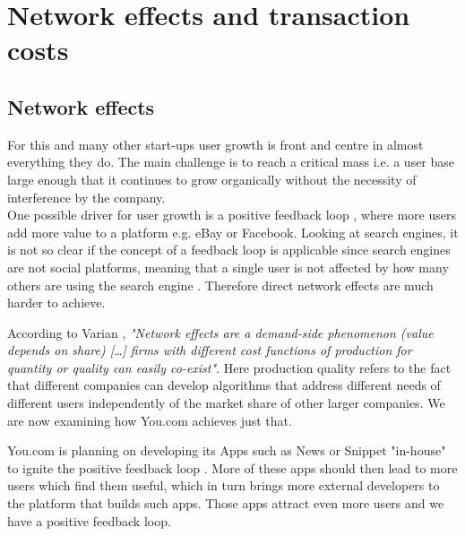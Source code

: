 \documentclass[5p,twocolumn,final]{elsarticle}
\begin{document}

\section{Network effects and transaction costs}

\subsection{Network effects}
For this and many other start-ups user growth is front and centre in almost everything they do.
The main challenge is to reach a critical mass \cite[p.15 ff.]{shapiro1999} i.e. a user base large enough that it continues to grow organically without the necessity of interference by the company.\\
One possible driver for user growth is a positive feedback loop \cite[p.175 ff.]{shapiro1999}, where more users add more value to a platform e.g. eBay or Facebook. Looking at search engines, it is not so clear if the concept of a feedback loop is applicable since search engines are not social platforms, meaning that a single user is not affected by how many others are using the search engine \cite{varian2017}. Therefore direct network effects are much harder to achieve. \par
According to Varian \cite{varian2017}, \textit{"Network effects are a demand-side phenomenon (value depends on share) […] firms with different cost functions of production for quantity or quality can easily co-exist"}. Here production quality refers to the fact that different companies can develop algorithms that address different needs of different users independently of the market share of other larger companies. We are now examining how You.com achieves just that.\par
You.com is planning on developing its Apps such as News or Snippet "in-house" to ignite the positive feedback loop \cite{techcrunch2022}. More of these apps should then lead to more users which find them useful, which in turn brings more external developers to the platform that builds such apps. Those apps attract even more users and we have a positive feedback loop.
\end{document}
